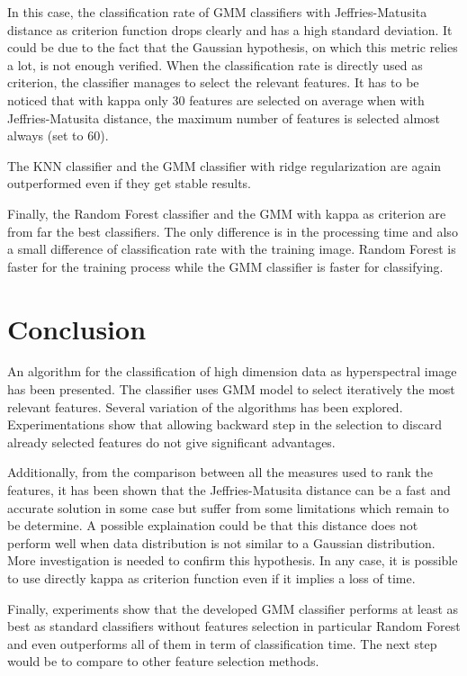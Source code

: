 \documentclass[journal,peerreview,onecolumn]{IEEEtran}
\begin{document}
    In this case, the classification rate of GMM classifiers with Jeffries-Matusita distance as criterion function drops clearly and has a high standard deviation. It could be due to the fact that the Gaussian hypothesis, on which this metric relies a lot, is not enough verified. When the classification rate is directly used as criterion, the classifier manages to select the relevant features. It has to be noticed that with kappa only 30 features are selected on average when with Jeffries-Matusita distance, the maximum number of features is selected almost always (set to 60).

    The KNN classifier and the GMM classifier with ridge regularization are again outperformed even if they get stable results.

    Finally, the Random Forest classifier and the GMM with kappa as criterion are from far the best classifiers. The only difference is in the processing time and also a small difference of classification rate with the training image. Random Forest is faster for the training process while the GMM classifier is faster for classifying.

\section{Conclusion}

An algorithm for the classification of high dimension data as hyperspectral image has been presented. The classifier uses GMM model to select iteratively the most relevant features. Several variation of the algorithms has been explored. Experimentations show that allowing backward step in the selection to discard already selected features do not give significant advantages.

Additionally, from the comparison between all the measures used to rank the features, it has been shown that the Jeffries-Matusita distance can be a fast and accurate solution in some case but suffer from some limitations which remain to be determine. A possible explaination could be that this distance does not perform well when data distribution is not similar to a Gaussian distribution. More investigation is needed to confirm this hypothesis. In any case, it is possible to use directly kappa as criterion function even if it implies a loss of time.

Finally, experiments show that the developed GMM classifier performs at least as best as standard classifiers without features selection in particular Random Forest and even outperforms all of them in term of classification time. The next step would be to compare to other feature selection methods.
\end{document}
